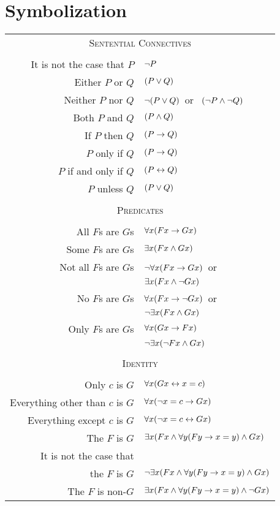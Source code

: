 \section{Symbolization}
\begin{center}
\label{app.symbolization}
\begin{tabular*}{\textwidth}{rl}
\multicolumn{2}{c}{\textsc{Sentential Connectives}}\\ \\
It is not the case that $P$ & $\neg P$\\
Either $P$ or $Q$ & $(P \vee Q)$\\
Neither $P$ nor $Q$ & $\neg(P \vee Q)$\ or \ $(\neg P \wedge \neg Q)$\\
Both $P$ and $Q$ & $(P \wedge Q)$\\
If $P$ then $Q$ & $(P \rightarrow Q)$\\
$P$ only if $Q$ & $(P \rightarrow Q)$\\
$P$ if and only if $Q$ & $(P \leftrightarrow Q)$\\
$P$ unless $Q$ & $(P \vee Q)$\\
\\
\multicolumn{2}{c}{\label{SymbolizingPredicates}\textsc{Predicates}}\\ \\
All $F$s are $G$s & $\forall x(\mathord{F}x \rightarrow \mathord{G}x)$\\
Some $F$s are $G$s & $\exists x(\mathord{F}x \wedge \mathord{G}x)$\\
Not all $F$s are $G$s & $\neg\forall x(\mathord{F}x \rightarrow \mathord{G}x)$\ or\\
& $\exists x(\mathord{F}x \wedge \neg \mathord{G}x)$\\
No $F$s are $G$s & $\forall x(\mathord{F}x \rightarrow\neg \mathord{G}x)$\ or\\
& $\neg\exists x(\mathord{F}x \wedge \mathord{G}x)$\\
Only $F$s are $G$s & $\forall x(\mathord{G}x \rightarrow \mathord{F}x)$\\
& $\neg\exists x(\neg\mathord{F}x \wedge \mathord{G}x)$\\
\\
\multicolumn{2}{c}{\textsc{Identity}}\\ \\
Only $c$ is $G$ & $\forall x(\mathord{G}x \leftrightarrow x=c)$\\
Everything other than $c$ is $G$ & $\forall x(\neg x = c \rightarrow \mathord{G}x )$\\
Everything except $c$ is $G$ & $\forall x(\neg x = c \leftrightarrow \mathord{G}x )$\\
The $F$ is $G$ & $\exists x(\mathord{F}x \wedge \forall y(\mathord{F}y \rightarrow x=y) \wedge \mathord{G}x )$\\
It is not the case that\\
 the $F$ is $G$ & $\neg\exists x(\mathord{F}x \wedge \forall y(\mathord{F}y \rightarrow x=y) \wedge \mathord{G}x )$\\
The $F$ is non-$G$ & $\exists x(\mathord{F}x \wedge \forall y(\mathord{F}y \rightarrow x=y) \wedge \neg \mathord{G}x )$
\end{tabular*}
\end{center}
